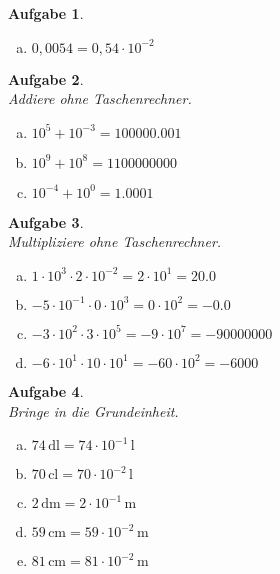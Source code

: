 \documentclass[12pt,fleqn]{article}
\theoremstyle{aufg}
\newtheorem{aufgabe}{Aufgabe}
\theoremstyle{bsp}
\begin{document}
\begin{flushleft}
\begin{aufgabe}
\begin{multicols}{3}
\begin{enumerate}[a)]
$0,0325=0,325\cdot10^{-1}$
\item 
$0,0054=0,54\cdot10^{-2}$
\end{enumerate} 
\end{multicols} 
\end{aufgabe} 
\begin{aufgabe} ~ \\ 
Addiere ohne Taschenrechner. \\ 
\begin{multicols}{3} 
\begin{enumerate}[a)] 
\item 
$10^{5}+10^{-3}=100000.001$
\item 
$10^{9}+10^{8}=1100000000$
\item 
$10^{-4}+10^{0}=1.0001$
\end{enumerate} 
\end{multicols} 
\end{aufgabe} 
\begin{aufgabe} ~ \\ 
Multipliziere ohne Taschenrechner. \\ 
\begin{multicols}{2} 
\begin{enumerate}[a)] 
\item 
$1\cdot10^{3}\cdot2\cdot10^{-2}=$$2\cdot 10^{1}=$$20.0$
\item 
$-5\cdot10^{-1}\cdot0\cdot10^{3}=$$0\cdot 10^{2}=$$-0.0$
\item 
$-3\cdot10^{2}\cdot3\cdot10^{5}=$$-9\cdot 10^{7}=$$-90000000$
\item 
$-6\cdot10^{1}\cdot10\cdot10^{1}=$$-60\cdot 10^{2}=$$-6000$
\end{enumerate} 
\end{multicols} 
\end{aufgabe} 
\begin{aufgabe} ~ \\ 
Bringe in die Grundeinheit. \\ 
\begin{multicols}{3} 
\begin{enumerate}[a)] 
\item 
$74\,\mathrm{dl}=74\cdot 10^{-1} \,\mathrm{l^{}}$
\item 
$70\,\mathrm{cl}=70\cdot 10^{-2} \,\mathrm{l^{}}$
\item 
$2\,\mathrm{dm}=2\cdot 10^{-1} \,\mathrm{m^{}}$
\item 
$59\,\mathrm{cm}=59\cdot 10^{-2} \,\mathrm{m^{}}$
\item 
$81\,\mathrm{cm}=81\cdot 10^{-2} \,\mathrm{m^{}}$

\end{enumerate}
\end{multicols}
\end{aufgabe}
\end{flushleft}
\end{document}
